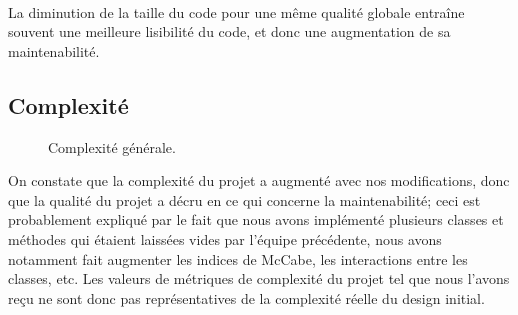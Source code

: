 \paragraph{}
La diminution de la taille du code pour une même qualité globale entraîne souvent une meilleure lisibilité du code, et donc une augmentation de sa maintenabilité. 
\newpage
\subsection{Complexité}

    \begin{figure}[h!]
        \centering
        \qquad
        \caption{Complexité générale.}
    \end{figure}
On constate que la complexité du projet a augmenté avec nos modifications, donc que la qualité du projet a décru en ce qui concerne la maintenabilité; ceci est probablement expliqué par le fait que nous avons implémenté plusieurs classes et méthodes qui étaient laissées vides par l'équipe précédente, nous avons notamment fait augmenter les indices de McCabe, les interactions entre les classes, etc. Les valeurs de métriques de complexité du projet tel que nous l'avons reçu ne sont donc pas représentatives de la complexité réelle du design initial. 

